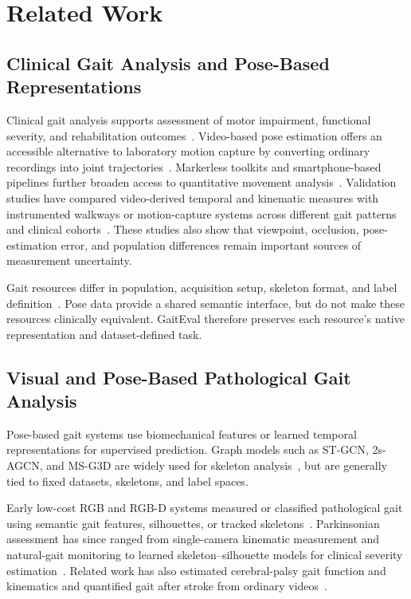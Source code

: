 \section{Related Work}

\subsection{Clinical Gait Analysis and Pose-Based Representations}

Clinical gait analysis supports assessment of motor impairment, functional severity, and rehabilitation outcomes~\cite{perry1992gait,baker2006gait,simon2004gait}. Video-based pose estimation offers an accessible alternative to laboratory motion capture by converting ordinary recordings into joint trajectories~\cite{stenum2021applications,stenum2024clinical}. Markerless toolkits and smartphone-based pipelines further broaden access to quantitative movement analysis~\cite{mathis2018deeplabcut,uhlrich2023opencap}. Validation studies have compared video-derived temporal and kinematic measures with instrumented walkways or motion-capture systems across different gait patterns and clinical cohorts~\cite{verlekar2019validation,yamamoto2021openpose,sabo2022validity}. These studies also show that viewpoint, occlusion, pose-estimation error, and population differences remain important sources of measurement uncertainty.

Gait resources differ in population, acquisition setup, skeleton format, and label definition~\cite{kidzinski2020video,khalil2022ataxia,jun2020pathological}. Pose data provide a shared semantic interface, but do not make these resources clinically equivalent. GaitEval therefore preserves each resource's native representation and dataset-defined task.

\subsection{Visual and Pose-Based Pathological Gait Analysis}

Pose-based gait systems use biomechanical features or learned temporal representations for supervised prediction. Graph models such as ST-GCN, 2s-AGCN, and MS-G3D are widely used for skeleton analysis~\cite{yan2018stgcn,shi2019twostream,liu2020disentangling}, but are generally tied to fixed datasets, skeletons, and label spaces.

Early low-cost RGB and RGB-D systems measured or classified pathological gait using semantic gait features, silhouettes, or tracked skeletons~\cite{dolatabadi2017pathological,verlekar2018automatic,ortells2018vision}. Parkinsonian assessment has since ranged from single-camera kinematic measurement and natural-gait monitoring to learned skeleton--silhouette models for clinical severity estimation~\cite{shin2021quantitative,sabo2020parkinsonian,zeng2023video}. Related work has also estimated cerebral-palsy gait function and kinematics and quantified gait after stroke from ordinary videos~\cite{kidzinski2020video,pantzar2018cerebral,lonini2022stroke}.

